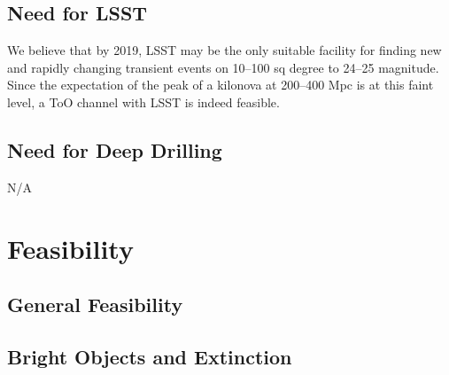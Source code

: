 \documentclass [11pt]{article}
\begin{document}

\subsection{Need for LSST}

%

We believe that by 2019, LSST may be the only suitable facility for finding new and rapidly changing transient events on 10--100 sq degree to 24--25 magnitude. Since the expectation of the peak of a kilonova at 200--400 Mpc is at this faint level, a ToO channel with LSST is indeed feasible.

\subsection{Need for Deep Drilling}


N/A

\section{Feasibility}


\subsection{General Feasibility}

%


\subsection{Bright Objects and Extinction}
 
\end{document}
